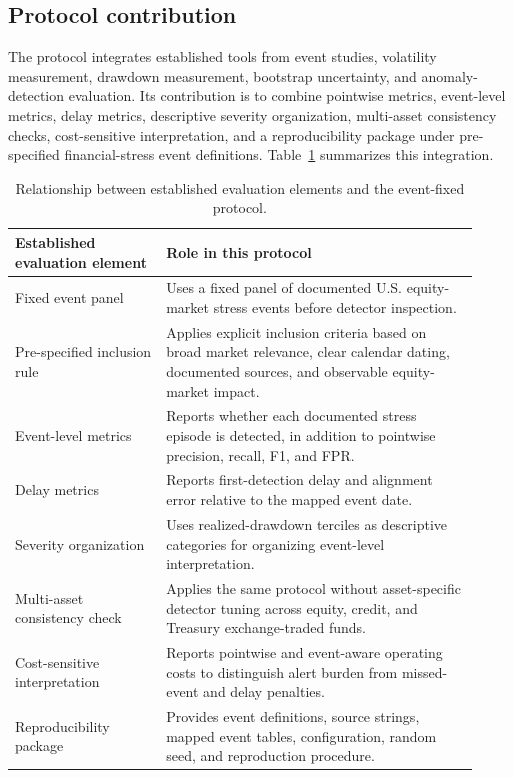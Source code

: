 \documentclass[10pt,twocolumn]{article}
\begin{document}
\subsection*{Protocol contribution}
The protocol integrates established tools from event studies, volatility measurement, drawdown measurement, bootstrap uncertainty, and anomaly-detection evaluation. Its contribution is to combine pointwise metrics, event-level metrics, delay metrics, descriptive severity organization, multi-asset consistency checks, cost-sensitive interpretation, and a reproducibility package under pre-specified financial-stress event definitions. Table~\ref{tab:protocol_comparison} summarizes this integration.

\begin{table}[t]
\centering
\caption{Relationship between established evaluation elements and the event-fixed protocol.}
\label{tab:protocol_comparison}
\scriptsize
\begin{tabular}{p{0.30\linewidth}p{0.62\linewidth}}
\toprule
Established evaluation element & Role in this protocol\\
\midrule
Fixed event panel & Uses a fixed panel of documented U.S. equity-market stress events before detector inspection.\\
Pre-specified inclusion rule & Applies explicit inclusion criteria based on broad market relevance, clear calendar dating, documented sources, and observable equity-market impact.\\
Event-level metrics & Reports whether each documented stress episode is detected, in addition to pointwise precision, recall, F1, and FPR.\\
Delay metrics & Reports first-detection delay and alignment error relative to the mapped event date.\\
Severity organization & Uses realized-drawdown terciles as descriptive categories for organizing event-level interpretation.\\
Multi-asset consistency check & Applies the same protocol without asset-specific detector tuning across equity, credit, and Treasury exchange-traded funds.\\
Cost-sensitive interpretation & Reports pointwise and event-aware operating costs to distinguish alert burden from missed-event and delay penalties.\\
Reproducibility package & Provides event definitions, source strings, mapped event tables, configuration, random seed, and reproduction procedure.\\
\bottomrule
\end{tabular}
\end{table}
\end{document}
